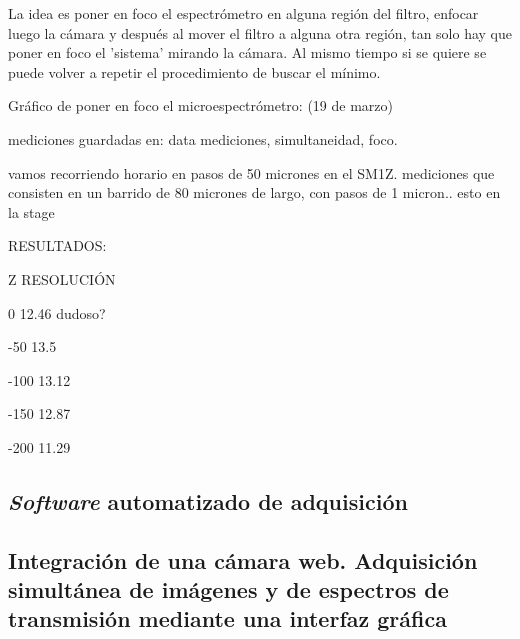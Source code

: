 La idea es poner en foco el espectrómetro en alguna región del filtro, enfocar luego la cámara y después al mover el filtro a alguna otra región, tan solo hay que poner en foco el 'sistema' mirando la cámara. Al mismo tiempo si se quiere se puede volver a repetir el procedimiento de buscar el mínimo.


Gráfico de poner en foco el microespectrómetro: (19 de marzo)

mediciones guardadas en: data mediciones, simultaneidad, foco.

vamos recorriendo horario en pasos de 50 micrones en el SM1Z.
mediciones que consisten en un barrido de 80 micrones de largo, con pasos de 1 micron.. esto en la stage


RESULTADOS:

Z                  RESOLUCIÓN

0                  12.46 dudoso?

-50               13.5

-100             13.12

-150              12.87

-200              11.29


\singlespacing
\subsection{\textit{Software} automatizado de adquisición}
\label{sec:softadq}


\singlespacing
\subsection{Integración de una cámara web. Adquisición simultánea de imágenes y de espectros de transmisión mediante una interfaz gráfica \href{https://github.com/jrr1984/defectsGUI}{\faGithub}}
\label{sec:camwebgui}


